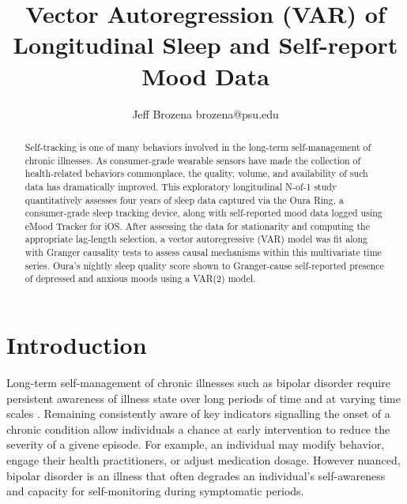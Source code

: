 \documentclass{article}
\begin{document}
\title{Vector Autoregression (VAR) of Longitudinal Sleep and Self-report Mood Data}

\author{\name Jeff Brozena \email brozena@psu.edu}
\maketitle

\begin{abstract}%

  Self-tracking is one of many behaviors involved in the long-term
  self-management of chronic illnesses. As consumer-grade wearable sensors have
  made the collection of health-related behaviors commonplace, the quality,
  volume, and availability of such data has dramatically improved. This
  exploratory longitudinal N-of-1 study quantitatively assesses four years of
  sleep data captured via the Oura Ring, a consumer-grade sleep tracking device,
  along with self-reported mood data logged using eMood Tracker for iOS. After
  assessing the data for stationarity and computing the appropriate lag-length
  selection, a vector autoregressive (VAR) model was fit along with Granger
  causality tests to assess causal mechanisms within this multivariate time
  series. Oura's nightly sleep quality score shown to Granger-cause
  self-reported presence of depressed and anxious moods using a VAR(2) model. 

\end{abstract}

\hypertarget{introduction}{%
\section{Introduction}\label{introduction}}

Long-term self-management of chronic illnesses such as bipolar disorder require
persistent awareness of illness state over long periods of time and at varying
time scales \citep{murnane2016SelfmonitoringPracticesAttitudes,
morton2018TakingBackReins, majid2022ExploringSelftrackingPractices}. Remaining
consistently aware of key indicators signalling the onset of a chronic condition
allow individuals a chance at early intervention to reduce the severity of a
givene episode. For example, an individual may modify behavior, engage their
health practitioners, or adjust medication dosage. However nuanced, bipolar
disorder is an illness that often degrades an individual's self-awareness and
capacity for self-monitoring during symptomatic periods.
\end{document}
